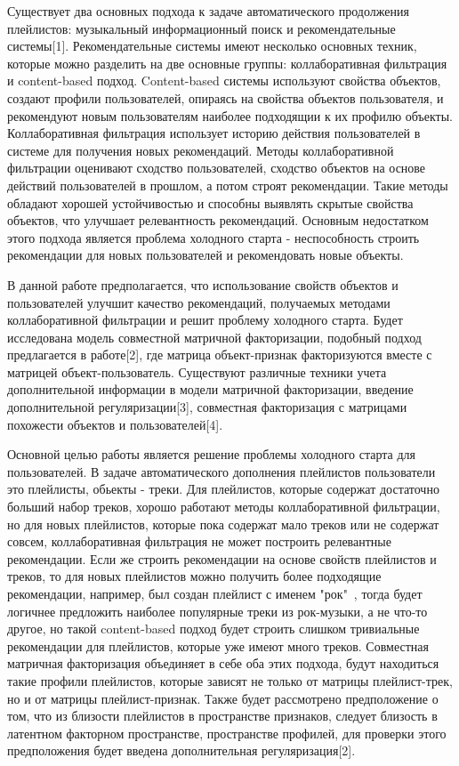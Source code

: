 \documentclass[12pt,twoside]{article}
\begin{document}
{Существует два основных подхода к задаче автоматического продолжения плейлистов: музыкальный информационный поиск и рекомендательные системы[1]. Рекомендательные системы имеют несколько основных техник, которые можно разделить на две основные группы: коллаборативная фильтрация и content-based подход. Content-based системы используют свойства объектов, создают профили пользователей, опираясь на свойства объектов пользователя, и рекомендуют новым пользователям наиболее подходящии к их профилю объекты. Коллаборативная фильтрация использует историю действия пользователей в системе для получения новых рекомендаций. Методы коллаборативной фильтрации оценивают сходство пользователей, сходство объектов на основе действий пользователей в прошлом, а потом строят рекомендации. Такие методы обладают хорошей устойчивостью и способны выявлять скрытые свойства объектов, что улучшает релевантность рекомендаций. Основным недостатком этого подхода является проблема холодного старта - неспособность строить рекомендации для новых пользователей и рекомендовать новые объекты. 

В данной работе предполагается, что использование свойств объектов и пользователей улучшит качество рекомендаций, получаемых методами коллаборативной фильтрации и  решит проблему  холодного старта. Будет исследована модель совместной матричной факторизации, подобный подход предлагается в работе[2], где матрица объект-признак факторизуются вместе с матрицей объект-пользователь. Существуют различные техники учета дополнительной информации в модели матричной факторизации, введение дополнительной регуляризации[3], совместная факторизация с матрицами похожести объектов и пользователей[4]. 

Основной целью работы является решение проблемы холодного старта для пользователей. В задаче автоматического дополнения плейлистов пользователи это плейлисты, обьекты - треки. Для плейлистов, которые содержат достаточно больший набор треков, хорошо работают методы коллаборативной фильтрации, но для новых плейлистов, которые пока содержат мало треков или не содержат совсем, коллаборативная фильтрация не может построить релевантные рекомендации. Если же строить рекомендации на основе свойств плейлистов и треков, то для новых плейлистов можно получить более подходящие рекомендации, например, был создан плейлист с именем "рок"\ , тогда будет логичнее предложить наиболее популярные треки из рок-музыки, а не что-то другое, но такой content-based подход будет строить слишком тривиальные рекомендации для плейлистов, которые уже имеют много треков. Совместная матричная факторизация объединяет в себе оба этих подхода, будут находиться такие профили плейлистов, которые зависят не только от матрицы плейлист-трек, но и от матрицы плейлист-признак. Также будет рассмотрено предположение о том, что из близости плейлистов в пространстве признаков, следует близость в латентном факторном пространстве, пространстве профилей, для проверки этого предположения будет введена дополнительная регуляризация[2].}
\end{document}
